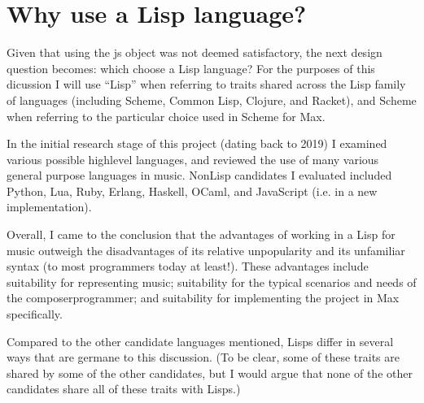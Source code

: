 \documentclass[letterpaper,10pt,english]{sphinxmanual}
\begin{document}
\section{Why use a Lisp language?}
\label{\detokenize{design:why-use-a-lisp-language}}
\sphinxAtStartPar
Given that using the js object was not deemed satisfactory, the next design question becomes:
which choose a Lisp language?
For the purposes of this dicussion I will use “Lisp” when referring to traits shared across the Lisp family of languages
(including Scheme, Common Lisp, Clojure, and Racket), and Scheme when referring to the particular choice used in Scheme for Max.

\sphinxAtStartPar
In the initial research stage of this project (dating back to 2019) I examined various possible high\sphinxhyphen{}level languages,
and reviewed the use of many various general purpose languages in music.
Non\sphinxhyphen{}Lisp candidates I evaluated included Python, Lua, Ruby, Erlang, Haskell, OCaml, and JavaScript (i.e. in a new implementation).

\sphinxAtStartPar
Overall, I came to the conclusion that the advantages of working in a Lisp for music outweigh the disadvantages
of its relative unpopularity and its unfamiliar syntax (to most programmers today at least!).
These advantages include suitability for representing music; suitability for the typical scenarios and needs of the composer\sphinxhyphen{}programmer;
and suitability for implementing the project in Max specifically.

\sphinxAtStartPar
Compared to the other candidate languages mentioned, Lisps differ in several ways that are germane to this
discussion. (To be clear, some of these traits are shared by some of the other candidates, but I would argue that none of the
other candidates share all of these traits with Lisps.)
\end{document}

